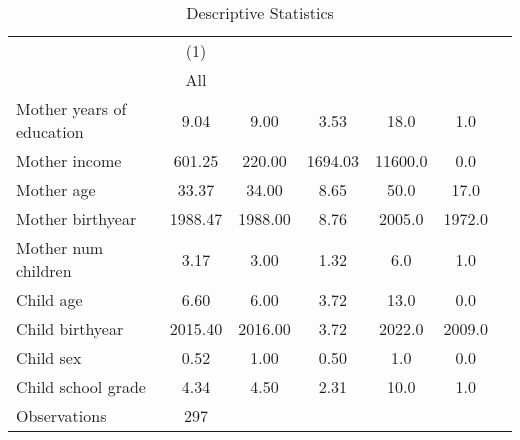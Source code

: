 \begin{table}[htbp]\centering
\def\sym#1{\ifmmode^{#1}\else\(^{#1}\)\fi}
\caption{Descriptive Statistics}
\begin{tabular}{l*{1}{cccccc}}
\hline\hline
                    &\multicolumn{1}{c}{(1)}&            &            &            &            \\
                    &         All&            &            &            &            \\
\hline
Mother years of education&        9.04&        9.00&        3.53&        18.0&         1.0\\
Mother income       &      601.25&      220.00&     1694.03&     11600.0&         0.0\\
Mother age          &       33.37&       34.00&        8.65&        50.0&        17.0\\
Mother birthyear    &     1988.47&     1988.00&        8.76&      2005.0&      1972.0\\
Mother num children &        3.17&        3.00&        1.32&         6.0&         1.0\\
Child age           &        6.60&        6.00&        3.72&        13.0&         0.0\\
Child birthyear     &     2015.40&     2016.00&        3.72&      2022.0&      2009.0\\
Child sex           &        0.52&        1.00&        0.50&         1.0&         0.0\\
Child school grade  &        4.34&        4.50&        2.31&        10.0&         1.0\\
\hline
Observations        &         297&            &            &            &            \\
\hline\hline
\end{tabular}
\end{table}
